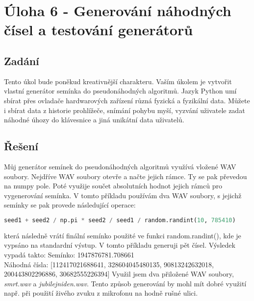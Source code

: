 \documentclass[a4paper,12pt]{article}
\begin{document}
	\section {Úloha 6 - Generování náhodných čísel a testování generátorů}
	\subsection{Zadání}
Tento úkol bude poněkud kreativnější charakteru. Vaším úkolem je vytvořit vlastní generátor semínka do pseudonáhodných algoritmů. Jazyk Python umí sbírat přes ovladače hardwarových zařízení různá fyzická a fyzikální data. Můžete i sbírat data z historie prohlížeče, snímání pohybu myší, vyzvání uživatele zadat náhodné úhozy do klávesnice a jiná unikátní data uživatelů. 

\subsection{Řešení}
Můj generátor semínek do pseudonáhodných algoritmů využívá vložené WAV soubory. Nejdříve WAV soubory otevře a načte jejich rámce. Ty se pak převedou na numpy pole. Poté využije součet absolutních hodnot jejich rámců pro vygenerování semínka. V tomto příkladu používám dva WAV soubory, s jejichž semínky se pak provede následující operace:

\begin{lstlisting}[language=Python]
seed1 + seed2 / np.pi * seed2 / seed1 / random.randint(10, 785410)
\end{lstlisting}
\justify
která následně vrátí finální semínko použité ve funkci random.randint(), kde je vypsáno na standardní výstup. V tomto příkladu generuji pět čísel. Výsledek vypadá takto:
\justify
Semínko: 1947876781.708661\\
Náhodná čísla: [112417021688641, 328604045480135, 90813242632018, 200443802296886, 30682555226394]
\justify
Využil jsem dva přiložené WAV soubory, \textit{smrt.wav} a \textit{jubilejni{\textunderscore}den.wav}. Tento způsob generování by mohl mít dobré využití např. při použití živého zvuku z mikrofonu na hodně rušné ulici.
	
\end{document}
